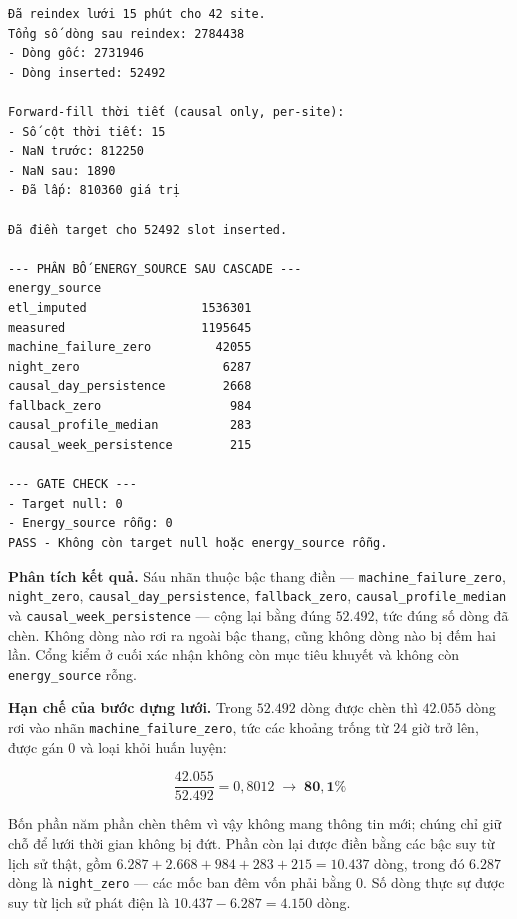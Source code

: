 \documentclass[12pt, a4paper]{report}
\begin{document}
\begingroup
\par{}\vspace{8pt}
\small\renewcommand{\baselinestretch}{1.0}\selectfont
\begin{verbatim}
Đã reindex lưới 15 phút cho 42 site.
Tổng số dòng sau reindex: 2784438
- Dòng gốc: 2731946
- Dòng inserted: 52492

Forward-fill thời tiết (causal only, per-site):
- Số cột thời tiết: 15
- NaN trước: 812250
- NaN sau: 1890
- Đã lấp: 810360 giá trị

Đã điền target cho 52492 slot inserted.

--- PHÂN BỐ ENERGY_SOURCE SAU CASCADE ---
energy_source
etl_imputed                1536301
measured                   1195645
machine_failure_zero         42055
night_zero                    6287
causal_day_persistence        2668
fallback_zero                  984
causal_profile_median          283
causal_week_persistence        215

--- GATE CHECK ---
- Target null: 0
- Energy_source rỗng: 0
PASS - Không còn target null hoặc energy_source rỗng.
\end{verbatim}
\par\vspace{8pt}
\endgroup

\textbf{Phân tích kết quả.} Sáu nhãn thuộc bậc thang điền --- \texttt{machine\_failure\_zero},
\texttt{night\_zero}, \texttt{causal\_day\_persistence}, \texttt{fallback\_zero},
\texttt{causal\_profile\_median} và \texttt{causal\_week\_persistence} --- cộng lại bằng đúng
$52.492$, tức đúng số dòng đã chèn. Không dòng nào rơi ra ngoài bậc thang, cũng không dòng
nào bị đếm hai lần. Cổng kiểm ở cuối xác nhận không còn mục tiêu khuyết và không còn
\texttt{energy\_source} rỗng.

\textbf{Hạn chế của bước dựng lưới.} Trong $52.492$ dòng được chèn thì $42.055$ dòng rơi vào
nhãn \texttt{machine\_failure\_zero}, tức các khoảng trống từ $24$ giờ trở lên, được gán $0$ và
loại khỏi huấn luyện:

\begin{equation}
\frac{42.055}{52.492} = 0{,}8012 \;\longrightarrow\; \mathbf{80{,}1\%}
\end{equation}

Bốn phần năm phần chèn thêm vì vậy không mang thông tin mới; chúng chỉ giữ chỗ để
lưới thời gian không bị đứt. Phần còn lại được điền bằng các bậc suy từ lịch sử thật, gồm
$6.287 + 2.668 + 984 + 283 + 215 = 10.437$ dòng, trong đó $6.287$ dòng là \texttt{night\_zero}
--- các mốc ban đêm vốn phải bằng $0$. Số dòng thực sự được suy từ lịch sử phát điện là
$10.437 - 6.287 = \mathbf{4.150}$ dòng.
\end{document}
